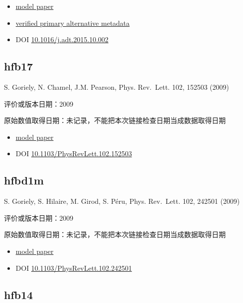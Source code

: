 \documentclass[
  11pt,
  letterpaper,
]{article}
\providecommand{\tightlist}{%
  \setlength{\itemsep}{0pt}\setlength{\parskip}{0pt}}
\begin{document}
\begin{itemize}
\tightlist
\item
  \href{https://doi.org/10.1016/j.adt.2015.10.002}{model paper}
\item
  \href{https://arxiv.org/abs/1508.06294}{verified primary alternative
  metadata}
\item
  DOI
  \href{https://doi.org/10.1016/j.adt.2015.10.002}{10.1016/j.adt.2015.10.002}
\end{itemize}

\subsection{hfb17}\label{hfb17}

S. Goriely, N. Chamel, J.M. Pearson, Phys. Rev.~Lett. 102, 152503 (2009)

评价或版本日期：2009

原始数值取得日期：未记录，不能把本次链接检查日期当成数据取得日期

\begin{itemize}
\tightlist
\item
  \href{https://doi.org/10.1103/PhysRevLett.102.152503}{model paper}
\item
  DOI
  \href{https://doi.org/10.1103/PhysRevLett.102.152503}{10.1103/PhysRevLett.102.152503}
\end{itemize}

\subsection{hfbd1m}\label{hfbd1m}

S. Goriely, S. Hilaire, M. Girod, S. Péru, Phys. Rev.~Lett. 102, 242501
(2009)

评价或版本日期：2009

原始数值取得日期：未记录，不能把本次链接检查日期当成数据取得日期

\begin{itemize}
\tightlist
\item
  \href{https://doi.org/10.1103/PhysRevLett.102.242501}{model paper}
\item
  DOI
  \href{https://doi.org/10.1103/PhysRevLett.102.242501}{10.1103/PhysRevLett.102.242501}
\end{itemize}

\subsection{hfb14}\label{hfb14}
\end{document}
